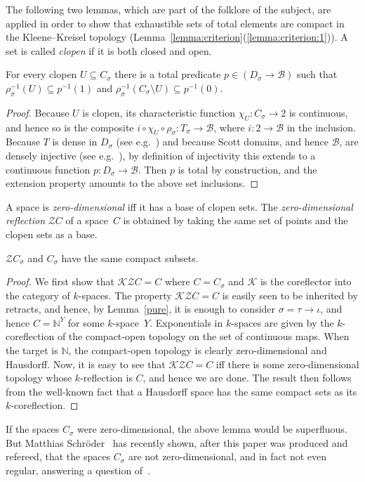 \documentclass{LMCS}
\newcommand{\K}{\mathcal{K}}
\newcommand{\Z}{\mathcal{Z}}
\newcommand{\N}{\mathbb{N}}
\newcommand{\Bool}{2}\newcommand{\Sierp}{\mathcal{S}}
\newcommand{\pBool}{\mathcal{B}}
\newcommand{\True}{1}\newcommand{\False}{0}\newcommand{\domain}[1]{{\D_{#1}}}
\newcommand{\total}[1]{{\T_{#1}}}
\newcommand{\quo}[1]{\qq_{#1}}
\newcommand{\qq}{\rho}
\newcommand{\D}{D}
\newcommand{\C}{C}
\newcommand{\T}{T}
\newcommand{\kk}[1]{{\C_{#1}}}
\newcommand{\comp}{\circ}
\begin{document}
The following two lemmas, which are part of the folklore of the
subject, are applied in order to show that exhaustible sets of total
elements are compact in the Kleene--Kreisel topology
(Lemma~\ref{lemma:criterion}(\ref{lemma:criterion:1})).
A set is called \emph{clopen} if it is both closed and open. 
\begin{lem} \label{clopen:extension} For every clopen $U \subseteq
  \kk{\sigma}$ there is a total predicate $p \in (\domain{\sigma}
  \to \pBool)$ such that $\quo{\sigma}^{-1}(U) \subseteq
  p^{-1}(\True)$ and $\quo{\sigma}^{-1}(\kk{\sigma} \setminus U) \subseteq
  p^{-1}(\False)$.
\end{lem}
\begin{proof}
  Because $U$ is clopen, its characteristic function $\chi_U \colon
  \C_\sigma \to \Bool$ is continuous, and hence so is the composite $i
  \comp \chi_U \comp \quo\sigma \colon \total{\sigma} \to \pBool$,
  where $i \colon \Bool \to \pBool$ in the inclusion. Because $\T$ is
  dense in $\D_\sigma$ (see e.g.\ \cite{berger:total}) and because
  Scott domains, and hence $\pBool$, are densely injective (see e.g.\
  \cite{gierz:domains}), by definition of injectivity this extends to
  a continuous function $p \colon \domain{\sigma} \to \pBool$. Then
  $p$ is total by construction, and the extension property amounts to
  the above set inclusions.
\end{proof}
A space is \emph{zero-dimensional} iff it has a base of clopen sets.
The \emph{zero-dimensional reflection} $\Z \C$ of a space~$\C$ is
obtained by taking the same set of points and the clopen sets as a
base.

\begin{lem} \label{zero:compact} $\Z \kk{\sigma}$ and $\kk{\sigma}$
  have the same compact subsets. 
\end{lem}
\begin{proof}
  We first show that $\K \Z C=C$ where $C=\kk{\sigma}$ and $\K$ is the
  coreflector into the category of $k$-spaces.  The property $\K \Z C
  = C$ is easily seen to be inherited by retracts, and hence, by
  Lemma~\ref{pure}, it is enough to consider $\sigma=\tau \to \iota$,
  and hence $C=\N^Y$ for some $k$-space~$Y$.  Exponentials in
  $k$-spaces are given by the $k$-coreflection of the compact-open
  topology on the set of continuous maps. When the target is $\N$, the
  compact-open topology is clearly zero-dimensional and Hausdorff.
  Now, it is easy to see that $\K \Z \C = \C$ iff there is some
  zero-dimensional topology whose $k$-reflection is $\C$, and hence we
  are done. The result then follows from the well-known fact that a
  Hausdorff space has the same compact sets as its $k$-coreflection.
\end{proof}
If the spaces $\kk{\sigma}$ were zero-dimensional, the above lemma
would be superfluous. But Matthias Schr\"oder~\cite{schroeder:not:regular} has recently shown,
after this paper was produced and refereed, that the spaces
$\kk{\sigma}$ are not zero-dimensional, and in fact not even regular,
answering a question of~\cite{bauer:escardo:simpson,normann:zero}.
\end{document}
